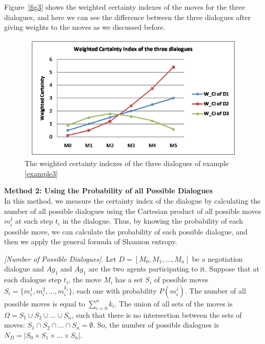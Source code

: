 \begin{example}
Figure~\ref{fig3} shows the weighted certainty indexes of the moves for the three dialogues, and here we can see the
difference between the three dialogues after giving weights to the moves as we discussed before.
\begin{figure}[t]
                \begin{center}
                \includegraphics[width=12cm, height=6cm]{Figures/WCIexam3.eps}
                \end{center}
                \caption{The weighted certainty indexes of the three dialogues of example \ref{example3}} \label{fig3}
                \label{Stack}
                \end{figure}
\end{example}

\textbf{Method 2: Using the Probability of all Possible Dialogues}\\
In this method, we measure the certainty index of the dialogue by calculating the number of all possible dialogues using the Cartesian
product of all possible moves $m_i^j$ at each step $t_i$ in the dialogue. Thus, by knowing the probability of each possible move, we
can calculate the probability of each possible dialogue, and then we apply the general formula of Shannon entropy.

\begin{definition}{\emph{[Number of Possible Dialogues]. }} \label{NofPDialogues}
Let $D = [M_0, M_1,\ldots, M_n]$ be a negotiation dialogue and $Ag_1$ and $Ag_1$ are the two agents participating to it. Suppose
that at each dialogue step $t_i$, the move $M_i$ has a set $S_i$ of possible moves $S_i=\{m_i^1,m_i^2,\ldots, m_i^{k_i}\}$, each
one with probability $P(m_i^j)$. The number of all possible moves is equal to $\sum_{i=0}^{n} k_i$. The union of all sets of the
moves is $\Omega= S_1 \cup S_2 \cup \ldots \cup S_n$, such that there is no intersection between the sets of moves: $S_1 \cap S_2
\cap \ldots \cap S_n = \emptyset$. So, the number of possible dialogues is $N_D = |S_0 \times S_1 \times \ldots \times S_n|$.
\end{definition}

